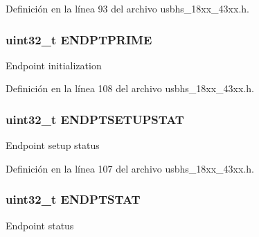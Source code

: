 Definición en la línea 93 del archivo usbhs\+\_\+18xx\+\_\+43xx.\+h.

\subsubsection[{\texorpdfstring{E\+N\+D\+P\+T\+P\+R\+I\+ME}{ENDPTPRIME}}]{ uint32\+\_\+t E\+N\+D\+P\+T\+P\+R\+I\+ME}\hypertarget{struct_l_p_c___u_s_b_h_s___t_aec0e228a214e4aa40c884097c7378b20}{}\label{struct_l_p_c___u_s_b_h_s___t_aec0e228a214e4aa40c884097c7378b20}
Endpoint initialization 

Definición en la línea 108 del archivo usbhs\+\_\+18xx\+\_\+43xx.\+h.

\subsubsection[{\texorpdfstring{E\+N\+D\+P\+T\+S\+E\+T\+U\+P\+S\+T\+AT}{ENDPTSETUPSTAT}}]{ uint32\+\_\+t E\+N\+D\+P\+T\+S\+E\+T\+U\+P\+S\+T\+AT}\hypertarget{struct_l_p_c___u_s_b_h_s___t_accba48676fff8fcbf244de513e0bafa3}{}\label{struct_l_p_c___u_s_b_h_s___t_accba48676fff8fcbf244de513e0bafa3}
Endpoint setup status 

Definición en la línea 107 del archivo usbhs\+\_\+18xx\+\_\+43xx.\+h.

\subsubsection[{\texorpdfstring{E\+N\+D\+P\+T\+S\+T\+AT}{ENDPTSTAT}}]{ uint32\+\_\+t E\+N\+D\+P\+T\+S\+T\+AT}\hypertarget{struct_l_p_c___u_s_b_h_s___t_a0ef4c759cd3e09a6ef5ffc333f0ad582}{}\label{struct_l_p_c___u_s_b_h_s___t_a0ef4c759cd3e09a6ef5ffc333f0ad582}
Endpoint status 

